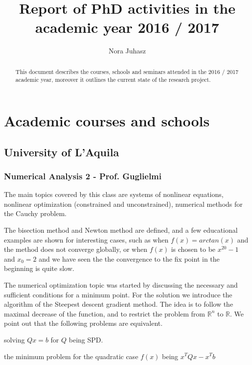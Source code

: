 \documentclass{article}
\title{Report of PhD activities in the academic year 2016 / 2017}
\author{Nora Juhasz}
\begin{document}
\maketitle
\newpage

\begin{abstract}

This document describes the courses, schools and seminars attended in the 2016 / 2017 academic year, moreover it outlines the current state of the research project.\\

\end{abstract}
\newpage

\tableofcontents
\newpage

\section{Academic courses and schools}
\subsection{University of L'Aquila}

\subsubsection{Numerical Analysis 2 - Prof. Guglielmi}
The main topics covered by this class are systems of nonlinear equations, nonlinear optimization (constrained and unconstrained), numerical methods for the Cauchy problem.

The bisection method and Newton method are defined, and a few educational examples are shown for interesting cases, such as when $f(x) = arctan(x)$ and the method does not converge globally, or when $f(x)$ is chosen to be $x^{20} - 1$ and $x_0 = 2$ and we have seen the the convergence to the fix point in the beginning is quite slow.

The numerical optimization topic was started by discussing the necessary and sufficient conditions for a minimum point. For the solution we introduce the algorithm of the Steepest descent gradient method. The idea is to follow the maximal decrease of the function, and to restrict the problem from $\mathbb{R}^n$ to $\mathbb{R}$. We point out that the following problems are equivalent.

\begin{outline}[enumerate]

\1 solving $Qx = b$ for $Q$ being SPD.

\1 the minimum problem for the quadratic case $f(x)$ being $x^TQx - x^Tb$

\end{outline}
\end{document}
